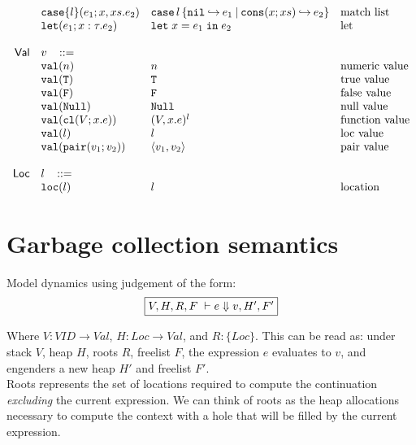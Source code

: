 \documentclass[11pt]{article}
\newcommand{\ms}[1]{\ensuremath{\mathsf{#1}}}
\newcommand{\irl}[1]{\mathtt{#1}}
\begin{document}
\[\begin{array}{r l l l l}
 	& \listcaseexabt{l}{e_1}{x}{xs}{e_2}					& \listcaseexcst{l}{e_1}{x}{xs}{e_2}   	& \text{match list}\\
  & \irl{let}(e_1; x : \tau.e_2)			& \irl{let}\; x = e_1 \; \irl{in}\; e_2   	& \text{let}\\
  \\
\ms{Val}
        & v   \,\,\,\,\, ::= \\
 	& \irl{val}(n)                                			& n 												& \text{numeric value}\\
 	& \irl{val}(\irl{T})                               			& \irl{T} 								  & \text{true value}\\
 	& \irl{val}(\irl{F})                                			& \irl{F}								  & \text{false value}\\
 	& \irl{val}(\irl{Null})                                  & \irl{Null} 								  & \text{null value}\\
 	& \irl{val}(\irl{cl}(V; x.e))                & (V, x.e)^l 					& \text{function value}\\
 	& \irl{val}(l)                                			& l 								  & \text{loc value}\\
 	& \irl{val}(\pairexabt{v_1}{v_2})                             & \pairexcst{v_1}{v_2} 								  & \text{pair value}\\
  \\
\ms{Loc}
        & l   \,\,\,\,\, ::= \\
 	& \irl{loc}(l)                                			& l 												& \text{location}\\
\end{array}
\]

\section{Garbage collection semantics}

Model dynamics using judgement of the form:
\[
\fbox{$V,H,R,F \; \vdash e \Downarrow v, H', F'$}
\]

Where $V : VID \to Val$, $H : Loc \to Val$, and $R : \{Loc\}$. This can be read as: under stack $V$, heap $H$, roots $R$,
freelist $F$, the expression $e$ evaluates to $v$, and engenders a new heap $H'$ and freelist $F'$.\\

Roots represents the set of locations required to compute the continuation \emph{excluding} the current expression.
We can think of roots as the heap allocations necessary to compute the context with a hole that will be filled
by the current expression.\\
\end{document}
